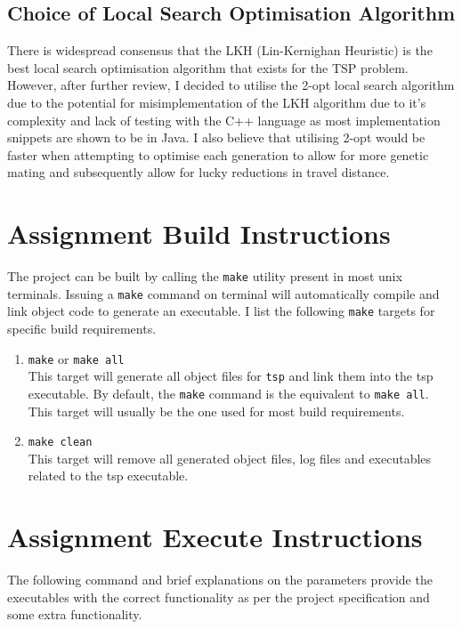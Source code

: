 \documentclass[12pt]{article}
\begin{document}
\subsection{Choice of Local Search Optimisation Algorithm} 
There is widespread consensus that the LKH (Lin-Kernighan Heuristic) is the best local search optimisation algorithm that exists for the TSP problem. However, after further review, I decided to utilise the 2-opt local search algorithm due to the potential for misimplementation of the LKH algorithm due to it's complexity and lack of testing with the C++ language as most implementation snippets are shown to be in Java. I also believe that utilising 2-opt would be faster when attempting to optimise each generation to allow for more genetic mating and subsequently allow for lucky reductions in travel distance.

\section{Assignment Build Instructions}
The project can be built by calling the \texttt{make} utility present in most unix terminals. Issuing a \texttt{make} command on terminal will automatically compile and link object code to generate an executable. I list the following \texttt{make} targets for specific build requirements.

\begin{enumerate}
	\item \texttt{make} or \texttt{make all}\\
		This target will generate all object files for \texttt{tsp} and link them into the tsp executable. By default, the \texttt{make} command is the equivalent to \texttt{make all}. This target will usually be the one used for most build requirements.
	
	\item \texttt{make clean}\\
		This target will remove all generated object files, log files and executables related to the tsp executable.
\end{enumerate}

\section{Assignment Execute Instructions}
The following command and brief explanations on the parameters provide the executables with the correct functionality as per the project specification and some extra functionality.
\end{document}
